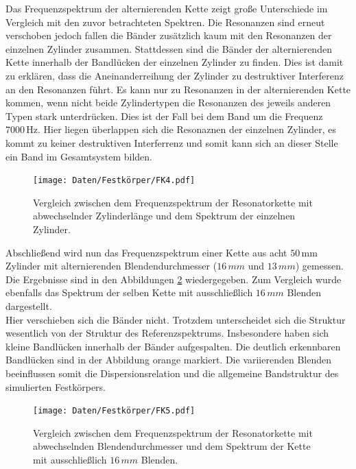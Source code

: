 Das Frequenzspektrum der alternierenden Kette zeigt große Unterschiede im Vergleich mit den zuvor betrachteten Spektren. Die Resonanzen sind erneut verschoben jedoch fallen die Bänder zusätzlich kaum mit den Resonanzen der einzelnen Zylinder zusammen. 
Stattdessen sind die Bänder der alternierenden Kette innerhalb der Bandlücken der einzelnen Zylinder zu finden. Dies ist damit zu erklären, dass die Aneinanderreihung der Zylinder zu destruktiver Interferenz an den Resonanzen führt. Es kann nur zu Resonanzen in der alternierenden Kette kommen, wenn nicht beide Zylindertypen die Resonanzen des jeweils anderen Typen stark unterdrücken. 
Dies ist der Fall bei dem Band um die Frequenz $7000 \, \si{\hertz}$. Hier liegen überlappen sich die Resonaznen der einzelnen Zylinder, es kommt zu keiner destruktiven Interferrenz und somit kann sich an dieser Stelle ein Band im Gesamtsystem bilden. \\ 

\begin{figure}[H]
  \centering
  \texttt{[image: Daten/Festkörper/FK4.pdf]} 
  \caption{Vergleich zwischen dem Frequenzspektrum der Resonatorkette mit abwechselnder Zylinderlänge und dem Spektrum der einzelnen Zylinder.} 
  \label{fig:fkMod2}
\end{figure}
Abschließend wird nun das Frequenzspektrum einer Kette aus acht $50\,\si{\milli\metre}$ Zylinder mit alternierenden Blendendurchmesser ($16\, mm$ und $13\, mm$) gemessen. Die Ergebnisse sind in den Abbildungen \ref{fig:fkMod3} wiedergegeben. Zum Vergleich wurde ebenfalls das Spektrum der selben Kette mit ausschließlich $16\, mm$ Blenden dargestellt. \\
Hier verschieben sich die Bänder nicht. Trotzdem unterscheidet sich die Struktur wesentlich von der Struktur des Referenzspektrums. Insbesondere haben sich kleine Bandlücken innerhalb der Bänder aufgespalten. Die deutlich erkennbaren Bandlücken sind in der Abbildung orange markiert. 
Die variierenden Blenden beeinflussen somit die Dispersionsrelation und die allgemeine Bandstruktur des simulierten Festkörpers. 

\begin{figure}[H]
  \centering
  \texttt{[image: Daten/Festkörper/FK5.pdf]} 
  \caption{Vergleich zwischen dem Frequenzspektrum der Resonatorkette mit abwechselnden Blendendurchmesser und dem Spektrum der Kette mit ausschließlich $16\, mm$ Blenden.} 
  \label{fig:fkMod3}
\end{figure}